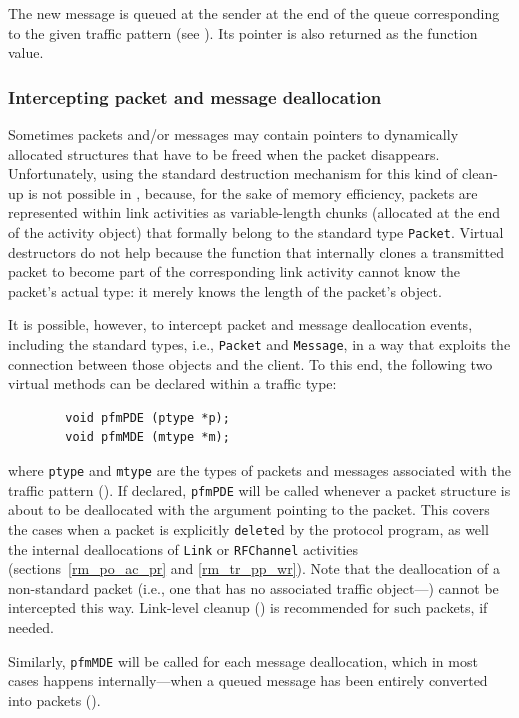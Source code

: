 The new message is queued at the sender at the end of
the queue corresponding to the given traffic pattern (see ).
Its pointer is also returned as the function value.

\subsubsection{Intercepting packet and message deallocation}
\label{rm_cl_dt_de}

Sometimes packets and/or messages may contain pointers to dynamically allocated
structures that have to be freed when the packet disappears.
Unfortunately, using the standard destruction mechanism for this kind of 
clean-up is not possible in \smurph, because, for the sake of
memory efficiency, packets are represented
within link activities as variable-length chunks (allocated at the end of
the activity object) that formally belong to the standard type {\tt Packet}.
Virtual destructors do not help because the function that internally clones
a transmitted packet to become part of the corresponding link activity
cannot know the packet's actual type: it merely knows the length of the 
packet's object.

It is possible, however, to intercept packet and message deallocation events,
including the standard types, i.e., {\tt Packet} and {\tt Message}, in a way
that exploits the connection between those objects and the client.
To this end,
the following two virtual methods can be declared within a traffic type:

\begin{verbatim}
        void pfmPDE (ptype *p);
        void pfmMDE (mtype *m);
\end{verbatim}
\noindent
where {\tt ptype} and {\tt mtype} are the types of packets and messages
associated with the traffic pattern ().
If declared, {\tt pfmPDE} will be called whenever a packet structure is
about to be deallocated with the argument pointing to the packet.
This covers the cases when a packet is explicitly {\tt delete}d by the
protocol program, as well the internal deallocations of {\tt Link} or
{\tt RFChannel} activities (sections~\ref{rm_po_ac_pr} and \ref{rm_tr_pp_wr}).
Note that the deallocation of a
non-standard packet (i.e., one that has no associated traffic
object---) cannot be intercepted this way.
Link-level cleanup () is recommended for such packets,
if needed.

Similarly, {\tt pfmMDE} will be called for each message deallocation, which
in most cases happens internally---when a queued message has been entirely 
converted into packets ().

